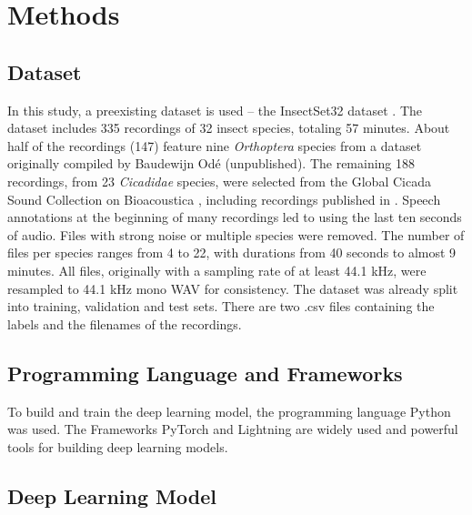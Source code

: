 

\section{Methods}
\label{methods}

\subsection{Dataset}%

In this study, a preexisting dataset is used -- the InsectSet32 dataset \autocite{faissInsectSet32DatasetAutomatic2022}. 
The dataset includes 335 recordings of 32 insect species, totaling 57 minutes.
About half of the recordings (147) feature nine \textit{Orthoptera} species from a dataset originally compiled by Baudewijn Odé (unpublished). 
The remaining 188 recordings, from 23 \textit{Cicadidae} species, were selected from the Global Cicada Sound 
Collection on Bioacoustica \autocite{bakerBioAcousticaFreeOpen2015}, including recordings 
published in \autocites{bakerGlobalCicadaSound2015}{poppleRevisionMyopsaltaCrucifera2017}. 
Speech annotations at the beginning of many recordings led to using the last ten seconds of audio. 
Files with strong noise or multiple species were removed. The number of files per species ranges from 4 to 22, 
with durations from 40 seconds to almost 9 minutes. All files, originally with a sampling rate of at least 44.1 kHz, 
were resampled to 44.1 kHz mono WAV for consistency.
The dataset was already split into training, validation and test sets. There are two .csv files containing
the labels and the filenames of the recordings.

\subsection{Programming Language and Frameworks}%
To build and train the deep learning model, the programming language Python was used.
The Frameworks PyTorch and Lightning are widely used and powerful tools for building deep learning models.

\subsection{Deep Learning Model}%


